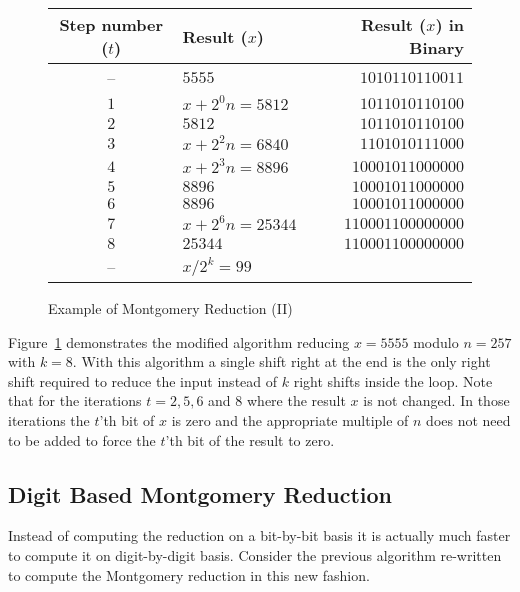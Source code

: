\documentclass[b5paper]{book}
\begin{document}
\begin{figure}[here]
\begin{small}
\begin{center}
\begin{tabular}{|c|l|r|}
\hline \textbf{Step number ($t$)} & \textbf{Result ($x$)} & \textbf{Result ($x$) in Binary} \\
\hline -- & $5555$ & $1010110110011$ \\
\hline $1$ & $x + 2^{0}n = 5812$ &  $1011010110100$ \\
\hline $2$ & $5812$ & $1011010110100$ \\
\hline $3$ & $x + 2^{2}n = 6840$ & $1101010111000$ \\
\hline $4$ & $x + 2^{3}n = 8896$ & $10001011000000$ \\
\hline $5$ & $8896$ & $10001011000000$ \\
\hline $6$ & $8896$ & $10001011000000$ \\
\hline $7$ & $x + 2^{6}n = 25344$ & $110001100000000$ \\
\hline $8$ & $25344$ & $110001100000000$ \\
\hline -- & $x/2^k = 99$ & \\
\hline
\end{tabular}
\end{center}
\end{small}
\caption{Example of Montgomery Reduction (II)}
\label{fig:MONT2}
\end{figure}

Figure~\ref{fig:MONT2} demonstrates the modified algorithm reducing $x = 5555$ modulo $n = 257$ with $k = 8$. 
With this algorithm a single shift right at the end is the only right shift required to reduce the input instead of $k$ right shifts inside the 
loop.  Note that for the iterations $t = 2, 5, 6$ and $8$ where the result $x$ is not changed.  In those iterations the $t$'th bit of $x$ is 
zero and the appropriate multiple of $n$ does not need to be added to force the $t$'th bit of the result to zero.  

\subsection{Digit Based Montgomery Reduction}
Instead of computing the reduction on a bit-by-bit basis it is actually much faster to compute it on digit-by-digit basis.  Consider the
previous algorithm re-written to compute the Montgomery reduction in this new fashion.
\end{document}
